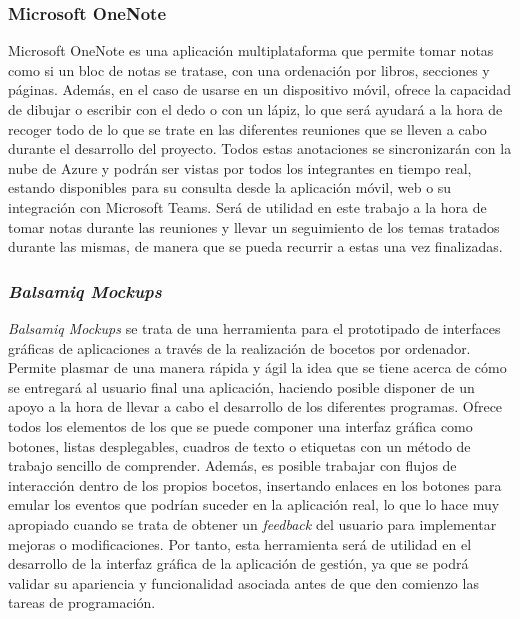 \subsubsection{Microsoft OneNote}
Microsoft OneNote \cite{onenote} es una aplicación multiplataforma que permite tomar notas como si un bloc de notas se tratase, con una ordenación por libros, secciones y páginas. Además, en el caso de usarse en un dispositivo móvil, ofrece la capacidad de dibujar o escribir con el dedo o con un lápiz, lo que será ayudará a la hora de recoger todo de lo que se trate en las diferentes reuniones que se lleven a cabo durante el desarrollo del proyecto. Todos estas anotaciones se sincronizarán con la nube de Azure y podrán ser vistas por todos los integrantes en tiempo real, estando disponibles para su consulta desde la aplicación móvil, web o su integración con Microsoft Teams. Será de utilidad en este trabajo a la hora de tomar notas durante las reuniones y llevar un seguimiento de los temas tratados durante las mismas, de manera que se pueda recurrir a estas una vez finalizadas.

\subsubsection{\textit{Balsamiq Mockups}}
\textit{Balsamiq Mockups} \cite{balsamiq} se trata de una herramienta para el prototipado de interfaces gráficas de aplicaciones a través de la realización de bocetos por ordenador. Permite plasmar de una manera rápida y ágil la idea que se tiene acerca de cómo se entregará al usuario final una aplicación, haciendo posible disponer de un apoyo a la hora de llevar a cabo el desarrollo de los diferentes programas. Ofrece todos los elementos de los que se puede componer una interfaz gráfica como botones, listas desplegables, cuadros de texto o etiquetas con un método de trabajo sencillo de comprender. Además, es posible trabajar con flujos de interacción dentro de los propios bocetos, insertando enlaces en los botones para emular los eventos que podrían suceder en la aplicación real, lo que lo hace muy apropiado cuando se trata de obtener un \textit{feedback} del usuario para implementar mejoras o modificaciones. Por tanto, esta herramienta será de utilidad en el desarrollo de la interfaz gráfica de la aplicación de gestión, ya que se podrá validar su apariencia y funcionalidad asociada antes de que den comienzo las tareas de programación.

